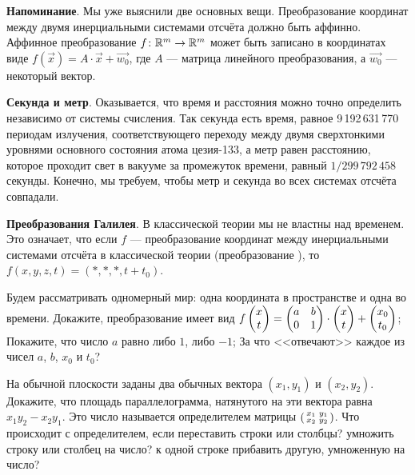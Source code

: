 \documentclass[a4paper,12pt]{article}
\newcommand{\smat}[1]{\hr{\begin{smallmatrix}#1\end{smallmatrix}}}
\newcommand{\мв}{\,м$_в$}
\begin{document}

{\footnotesize
\noindent\textbf{Напоминание}.
Мы уже выяснили две основных вещи.
Преобразование координат между двумя инерциальными системами отсчёта должно быть аффинно.
Аффинное преобразование $f\colon\mathbb{R}^m\rightarrow\mathbb{R}^m$ может быть записано в координатах виде $f(\vec{x}) = A\cdot \vec{x} + \vec{w_0}$,
где $A$ --- матрица линейного преобразования, а $\vec{w_0}$ --- некоторый вектор.

\noindent\textbf{Секунда и метр}.
Оказывается, что время и расстояния можно точно определить независимо от системы счисления.
Так секунда есть время, равное 9\,192\,631\,770 периодам излучения, соответствующего переходу между двумя сверхтонкими уровнями основного состояния атома цезия-133, а метр равен расстоянию, которое проходит свет в вакууме за промежуток времени, равный $1/299\,792\,458$ секунды.
Конечно, мы требуем, чтобы метр и секунда во всех системах отсчёта совпадали.

\noindent\textbf{Преобразования Галилея}.
В классической теории мы не властны над временем.
Это означает, что если $f$ --- преобразование координат между инерциальными системами отсчёта в классической теории (преобразование ), то $f(x,y,z,t) = (*,*,*,t+t_0)$.
\par}


Будем рассматривать одномерный мир: одна координата в пространстве и одна во времени.
Докажите, преобразование имеет вид $f\begin{pmatrix}x\\t\end{pmatrix} = \begin{pmatrix}a&b\\0&1\end{pmatrix}\cdot\begin{pmatrix}x\\t\end{pmatrix}+\begin{pmatrix}x_0\\t_0\end{pmatrix}$;
Покажите, что число $a$ равно либо $1$, либо $-1$;
За что <<отвечают>> каждое из чисел $a$, $b$, $x_0$ и $t_0$?


На обычной плоскости заданы два обычных вектора $(x_1,y_1)$ и $(x_2,y_2)$. Докажите, что площадь параллелограмма, натянутого на эти вектора равна $x_1y_2-x_2y_1$. Это число называется  определителем матрицы $\smat{x_1&y_1\\x_2&y_2}$.
Что происходит с определителем, если
переставить строки или столбцы?
умножить строку или столбец на число?
к одной строке прибавить другую, умноженную на число?

%
\end{document}
